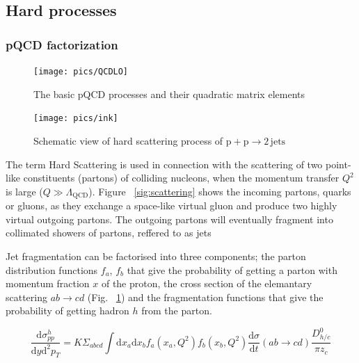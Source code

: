 %
%
%

\subsection{Hard processes}
\subsubsection{pQCD factorization}


\begin{figure}[htb]
\centering
\texttt{[image: pics/QCDLO]}
\caption[QCD Leading Order]{The basic pQCD processes and their quadratic matrix elements}
\label{fig:qcdlo}
\end{figure}

\begin{figure}[htb]
\centering
\texttt{[image: pics/ink]}
\caption[Hard scattering]{Schematic view of hard scattering process of $\mathrm{p+p\rightarrow 2\,jets}$}
\label{fig:scattering}
\end{figure}
The term Hard Scattering is used in connection with the scattering of two point-like constituents (partons) of colliding nucleons, when the momentum transfer $Q^2$ is large ($Q \gg \Lambda_{\mathrm{QCD}}$). Figure ~\ref{sig:scattering} shows the incoming partons, quarks or gluons, as they exchange a space-like virtual gluon and produce two highly virtual outgoing partons. The outgoing partons will eventually fragment into collimated showers of partons, reffered to as jets

Jet fragmentation can be factorised into three components; the parton distribution functions $f_a$, $f_b$ that give the probability of getting a parton with momentum fraction $x$ of the proton, the cross section of the elemantary scattering $ab\rightarrow cd$ (Fig. ~\ref{fig:qcdlo}) and the fragmentation functions that give the probability of getting hadron $h$ from the parton.

$$\frac{\mathrm{d} \sigma^h_{pp}}{\mathrm{d}y\mathrm{d}^2p_T} = K \Sigma_{abcd}\int \mathrm{d}x_a \mathrm{d}x_b f_a\left(x_a,Q^2\right) f_b\left(x_b, Q^2\right) \frac{\mathrm{d} \sigma}{\mathrm{d}t}\left(ab\rightarrow cd \right)\frac{D_{h/c}^0}{\pi z_c}$$

